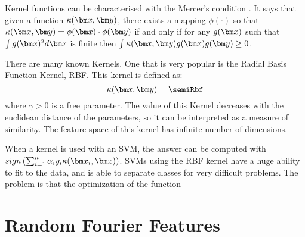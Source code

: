 \begin{pre-delivery}
Kernel functions can be characterised with the Mercer's condition
\cite{mercer1909functions}. It says that given a function $\kernel(\vx, \vy)$,
there exists a mapping $\phi(\cdot)$ so that
$\kernel(\vx, \vy) = \phi(\vx)\cdot\phi(\vy)$
if and only if for any $g(\vx)$ such that $\int g(\vx)^2 d\vx$ is finite then
$\int \kernel(\vx, \vy)g(\vx)g(\vy) \geq 0$.

There are many known Kernels. One that is very popular is the Radial Basis
Function Kernel, RBF. This kernel is defined as:
\begin{equation}
\kernel(\vx,\vy) = \semiRbf
\end{equation}
where $\gamma > 0$ is a free parameter. The value of this Kernel decreases with the
euclidean distance of the parameters, so it can be interpreted as a measure
of similarity. The feature space of this kernel has infinite number of
dimensions.

When a kernel is used with an SVM, the answer can be computed with
$sign\left(\sum_{i = 1}^n \alpha_iy_i\kernel(\vx_i, \vx)\right)$.
SVMs using the RBF kernel have a huge ability to fit to the data, and is able
to separate classes for very difficult problems. The problem is that the
optimization of the function

\end{pre-delivery}

\section{Random Fourier Features}


